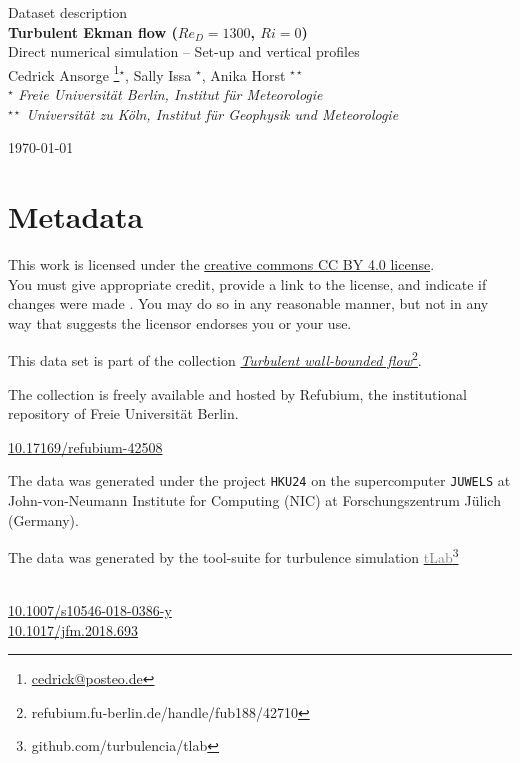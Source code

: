 \documentclass[11pt]{article}
\date{\nodate}
\makeatletter
\newcommand{\dstitle}{Turbulent Ekman flow ($Re_D=1300$, $Ri=0$)}
\newcommand{\subtitle}{Direct numerical simulation -- Set-up and vertical profiles}
\newcommand{\doi}{10.17169/refubium-42508}
\newcommand{\tlabName}{\textcolor{gray}{tLab}}
\newcommand{\authors}{
    Cedrick Ansorge \footnote{\href{mailto:cedrick@posteo.de}{cedrick@posteo.de}}$^\star$, \hspace{0.05cm}  
    Sally Issa $^\star$\hspace{0.05cm},
    Anika Horst $^{\star\star}$ \\[0.5em]
    {\small \light{$^\star$ \emph{ Freie Universit\"at Berlin, Institut f\"ur Meteorologie} \\
    $^{\star\star}$ \emph{Universit\"at zu K\"oln, Institut f\"ur Geophysik und Meteorologie}}}
}
\newcommand{\light}[1]{\textcolor{black!80}{#1}}
\newcommand{\printdoi}[1]{\href{https://dx.doi.org/#1}{#1}}
\makeatother
\begin{document}
{ \selectfont
\begin{centering}

 \light{\large Dataset description} \\[1em] 
 {\LARGE \bfseries \sffamily\dstitle} \\[1em]
 \light{\large\subtitle} \\[1em]
 \authors\\ 
\end{centering}
\light{\hfill \today}
}


\section{Metadata}
\begin{description}
\sffamily
\item[\textcopyright] This work is licensed under the \href{https://creativecommons.org/licenses/by/4.0}{creative commons CC BY 4.0 license}. \\ {\small\light{You must give appropriate credit, provide a link to the license, and indicate if changes were made . You may do so in any reasonable manner, but not in any way that suggests the licensor endorses you or your use. }}
\item[\sffamily Collection] This data set is part of the collection \href{https://refubium.fu-berlin.de/handle/fub188/42710}{\emph{Turbulent wall-bounded flow}\footnote{\url{refubium.fu-berlin.de/handle/fub188/42710}}}.

{\small \light{The collection is freely available and hosted by Refubium, the  institutional repository of Freie Universit\"at Berlin.}}

\item[\sffamily DOI]\printdoi{\doi}
\item[\sffamily HPC systems] The data was generated under the project \texttt{HKU24} on the supercomputer \texttt{JUWELS} at John-von-Neumann Institute for Computing (NIC) at Forschungszentrum J\"ulich (Germany). 
\item[\sffamily Code] The data was generated by the tool-suite for turbulence simulation \href{https://github.com/turbulencia/tlab}{\tlabName\footnote{\url{github.com/turbulencia/tlab}}}
\item[\sffamily Related Publications] ~\\
    \printdoi{10.1007/s10546-018-0386-y} \\
    \printdoi{10.1017/jfm.2018.693}\\
\end{description}
\end{document}
